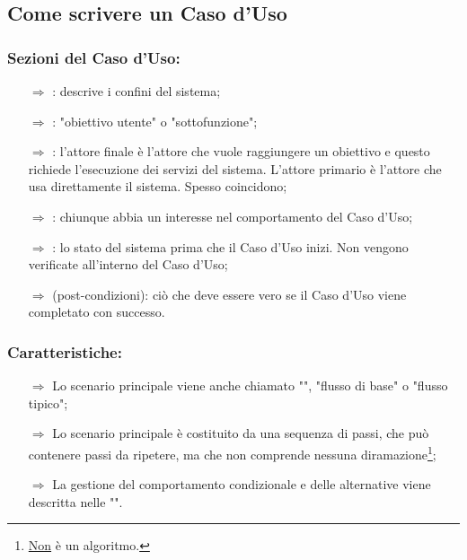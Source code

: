 \subsection{Come scrivere un Caso d'Uso}

\subsubsection{Sezioni del Caso d'Uso:}

\begin{itemize}
    \item [$\Rightarrow$] : descrive i confini del sistema;
    \item [$\Rightarrow$] : "obiettivo utente" o "sottofunzione";
    \item [$\Rightarrow$] : l'attore
    finale è l'attore che vuole raggiungere un obiettivo e questo richiede l'esecuzione dei servizi
    del sistema. L'attore primario è l'attore che usa direttamente il sistema. Spesso coincidono;
    \item [$\Rightarrow$] : chiunque abbia un interesse nel comportamento del Caso d'Uso;
    \item [$\Rightarrow$] : lo stato del sistema prima che il Caso d'Uso inizi. Non vengono verificate all'interno del Caso d'Uso;
    \item [$\Rightarrow$]  (post-condizioni): ciò che deve essere vero se il Caso d'Uso viene completato con successo.
\end{itemize}

\subsubsection{Caratteristiche:}

\begin{itemize}
    \item [$\Rightarrow$] Lo scenario principale viene anche chiamato "", "flusso
    di base" o "flusso tipico";
    \item [$\Rightarrow$] Lo scenario principale è costituito da una sequenza di passi, che può contenere passi da ripetere, ma che non comprende nessuna diramazione\footnote{\underline{Non} è un algoritmo.};
    \item [$\Rightarrow$] La gestione del comportamento condizionale e delle alternative viene descritta nelle "".
\end{itemize}

